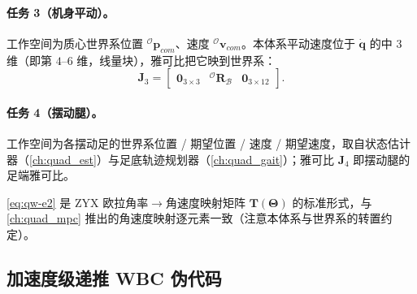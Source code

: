 \paragraph{任务 3（机身平动）。}
工作空间为质心世界系位置 ${}^{\mathcal{O}}\boldsymbol{p}_{com}$、速度 ${}^{\mathcal{O}}\boldsymbol{v}_{com}$。本体系平动速度位于 $\dot{\boldsymbol{q}}$ 的中 $3$ 维（即第 $4$--$6$ 维，线量块），雅可比把它映到世界系\cite{yu2021quadruped}：
\begin{equation}
  \boldsymbol{J}_3=\begin{bmatrix}\mathbf{0}_{3\times3} & {}^{\mathcal{O}}\mathbf{R}_{\mathcal{B}} & \mathbf{0}_{3\times12}\end{bmatrix}.
  \label{eq:qw-J3}
\end{equation}

\paragraph{任务 4（摆动腿）。}
工作空间为各摆动足的世界系位置 / 期望位置 / 速度 / 期望速度，取自状态估计器（\cref{ch:quad_est}）与足底轨迹规划器（\cref{ch:quad_gait}）；雅可比 $\boldsymbol{J}_4$ 即摆动腿的足端雅可比。

\cref{eq:qw-e2} 是 ZYX 欧拉角率$\to$角速度映射矩阵 $\boldsymbol{T}(\boldsymbol{\Theta})$ 的标准形式，与 \cref{ch:quad_mpc} 推出的角速度映射逐元素一致（注意本体系与世界系的转置约定）。

\subsection{加速度级递推 WBC 伪代码}
\label{subsec:qw-pseudocode}

